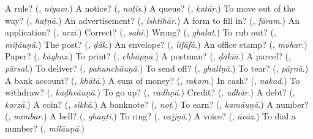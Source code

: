 \begin{tcolorbox}[breakable,colback=teal!4,colframe=teal!35!black,title={Before you move on}]
A rule? (\textbf{}, \emph{niyam}.) A notice? (\textbf{}, \emph{noṭis}.) A queue? (\textbf{}, \emph{katār}.) To move out of the way? (\textbf{}, \emph{haṭṇā}.) An advertisement? (\textbf{}, \emph{ishtihār}.) A form to fill in? (\textbf{}, \emph{fāram}.) An application? (\textbf{}, \emph{arzī}.) Correct? (\textbf{}, \emph{sahī}.) Wrong? (\textbf{}, \emph{ghalat}.) To rub out? (\textbf{}, \emph{miṭāuṇā}.) The post? (\textbf{}, \emph{ḍāk}.) An envelope? (\textbf{}, \emph{lifāfā}.) An office stamp? (\textbf{}, \emph{mohar}.) Paper? (\textbf{}, \emph{kāghaz}.) To print? (\textbf{}, \emph{chhāpṇā}.) A postman? (\textbf{}, \emph{ḍākīā}.) A parcel? (\textbf{}, \emph{pārsal}.) To deliver? (\textbf{}, \emph{pahunchāuṇā}.) To send off? (\textbf{}, \emph{ghallṇā}.) To tear? (\textbf{}, \emph{pāṛnā}.) A bank account? (\textbf{}, \emph{khātā}.) A sum of money? (\textbf{}, \emph{rakam}.) In cash? (\textbf{}, \emph{nakad}.) To withdraw? (\textbf{}, \emph{kaḍhvāuṇā}.) To go up? (\textbf{}, \emph{vadhṇā}.) Credit? (\textbf{}, \emph{udhār}.) A debt? (\textbf{}, \emph{karzā}.) A coin? (\textbf{}, \emph{sikkā}.) A banknote? (\textbf{}, \emph{noṭ}.) To earn? (\textbf{}, \emph{kamāuṇā}.) A number? (\textbf{}, \emph{nambar}.) A bell? (\textbf{}, \emph{ghaṇṭī}.) To ring? (\textbf{}, \emph{vajjṇā}.) A voice? (\textbf{}, \emph{āvāz}.) To dial a number? (\textbf{}, \emph{milāuṇā}.)
\end{tcolorbox}
